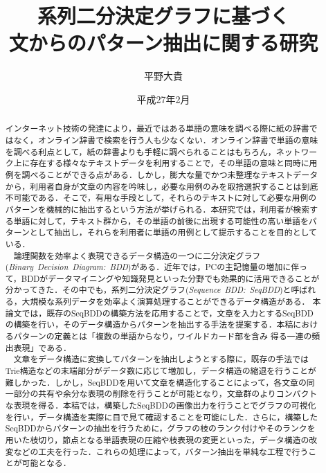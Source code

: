 \documentclass[12pt,twoside, fleqn]{ujbook}
\title{系列二分決定グラフに基づく\\文からのパターン抽出に関する研究}%
\author{平野大貴}%
\date{平成27年2月}%
\begin{document}
\maketitle

\makeblankpage
\begin{abstract}%
インターネット技術の発達により，最近ではある単語の意味を調べる際に紙の辞書ではなく，オンライン辞書で検索を行う人も少なくない．オンライン辞書で単語の意味を調べる利点として，紙の辞書よりも手軽に調べられることはもちろん，ネットワーク上に存在する様々なテキストデータを利用することで，その単語の意味と同時に用例を調べることができる点がある．しかし，膨大な量でかつ未整理なテキストデータから，利用者自身が文章の内容を吟味し，必要な用例のみを取捨選択することは到底不可能である．そこで，有用な手段として，それらのテキストに対して必要な用例のパターンを機械的に抽出するという方法が挙げられる．本研究では，利用者が検索する単語に対して，テキスト群から，その単語の前後に出現する可能性の高い単語をパターンとして抽出し，それらを利用者に単語の用例として提示することを目的としている．\\
　論理関数を効率よく表現できるデータ構造の一つに二分決定グラフ({\it Binary\ Decision\ Diagram:\ BDD})がある．近年では，PCの主記憶量の増加に伴って，BDDがデータマイニングや知識発見といった分野でも効果的に活用できることが分かってきた．その中でも，系列二分決定グラフ({\it Sequence\ BDD:\ SeqBDD})と呼ばれる，大規模な系列データを効率よく演算処理することができるデータ構造がある．
本論文では，既存のSeqBDDの構築方法を応用することで，文章を入力とするSeqBDDの構築を行い，そのデータ構造からパターンを抽出する手法を提案する．本稿におけるパターンの定義とは「複数の単語からなり，ワイルドカード部を含み
得る一連の頻出表現」である．\\
　文章をデータ構造に変換してパターンを抽出しようとする際に，既存の手法ではTrie構造などの末端部分がデータ数に応じて増加し，データ構造の縮退を行うことが難しかった．しかし，SeqBDDを用いて文章を構造化することによって，各文章の同一部分の共有や余分な表現の削除を行うことが可能となり，文章群のよりコンパクトな表現を得る．本稿では，構築したSeqBDDの画像出力を行うことでグラフの可視化を行い，データ構造を実際に目で見て確認することを可能にした．さらに，構築したSeqBDDからパターンの抽出を行うために，グラフの枝のランク付けやそのランクを用いた枝切り，節点となる単語表現の圧縮や枝表現の変更といった，データ構造の改変などの工夫を行った．これらの処理によって，パターン抽出を単純な工程で行うことが可能となる．\\

\end{abstract}
\end{document}
